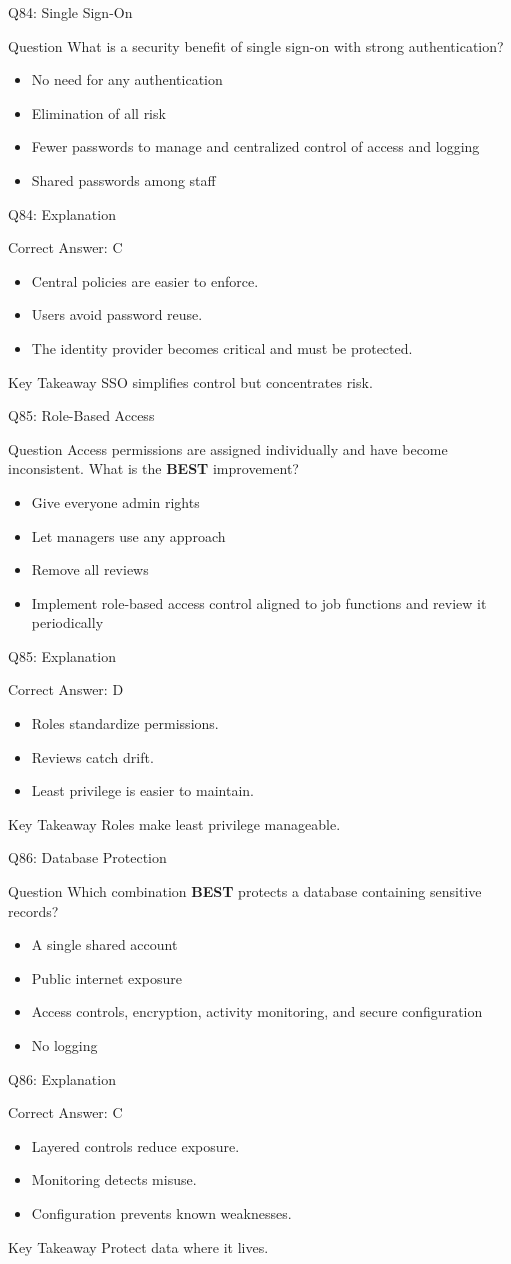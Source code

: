 \documentclass[aspectratio=169]{beamer}
\newcommand{\hq}[7]{%
	\begin{frame}{Q#1: #2}
		\begin{block}{Question}
			#3
		\end{block}
		\begin{itemize}
			#4
		\end{itemize}
	\end{frame}
	\begin{frame}{Q#1: Explanation}
		\begin{block}{Correct Answer: #5}
			\begin{itemize}
				#6
			\end{itemize}
		\end{block}
		\begin{alertblock}{Key Takeaway}
			#7
		\end{alertblock}
	\end{frame}
}
\begin{document}
	\hq{84}{Single Sign-On}
	{What is a security benefit of single sign-on with strong authentication?}
	{\item[\textbf{(A)}] No need for any authentication
		\item[\textbf{(B)}] Elimination of all risk
		\item[\textbf{(C)}] Fewer passwords to manage and centralized control of access and logging
		\item[\textbf{(D)}] Shared passwords among staff}
	{C}
	{\item Central policies are easier to enforce.
		\item Users avoid password reuse.
		\item The identity provider becomes critical and must be protected.}
	{SSO simplifies control but concentrates risk.}
	
	\hq{85}{Role-Based Access}
	{Access permissions are assigned individually and have become inconsistent. What is the \textbf{BEST} improvement?}
	{\item[\textbf{(A)}] Give everyone admin rights
		\item[\textbf{(B)}] Let managers use any approach
		\item[\textbf{(C)}] Remove all reviews
		\item[\textbf{(D)}] Implement role-based access control aligned to job functions and review it periodically}
	{D}
	{\item Roles standardize permissions.
		\item Reviews catch drift.
		\item Least privilege is easier to maintain.}
	{Roles make least privilege manageable.}
	
	\hq{86}{Database Protection}
	{Which combination \textbf{BEST} protects a database containing sensitive records?}
	{\item[\textbf{(A)}] A single shared account
		\item[\textbf{(B)}] Public internet exposure
		\item[\textbf{(C)}] Access controls, encryption, activity monitoring, and secure configuration
		\item[\textbf{(D)}] No logging}
	{C}
	{\item Layered controls reduce exposure.
		\item Monitoring detects misuse.
		\item Configuration prevents known weaknesses.}
	{Protect data where it lives.}
	
\end{document}
